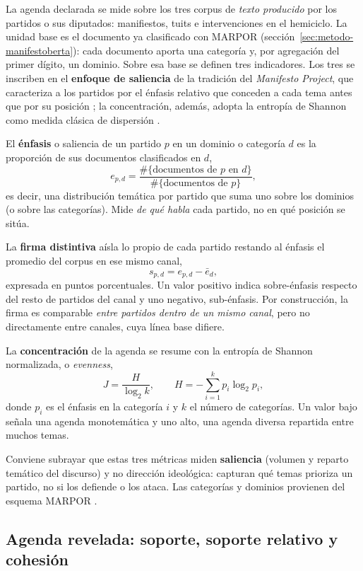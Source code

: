 La agenda declarada se mide sobre los tres corpus de \emph{texto producido} por
los partidos o sus diputados: manifiestos, tuits e intervenciones en el
hemiciclo. La unidad base es el documento ya clasificado con MARPOR
(sección~\ref{sec:metodo-manifestoberta}): cada documento aporta una categoría y,
por agregación del primer dígito, un dominio. Sobre esa base se definen tres
indicadores. Los tres se inscriben en el \textbf{enfoque de saliencia} de la
tradición del \emph{Manifesto Project}, que caracteriza a los partidos por el
énfasis relativo que conceden a cada tema antes que por su posición
\cite{laver1992party, marpor_mp_v5}; la concentración, además, adopta la entropía
de Shannon como medida clásica de dispersión \cite{shannon1948mathematical}.

El \textbf{énfasis} o saliencia de un partido $p$ en un dominio o categoría
$d$ es la proporción de sus documentos clasificados en $d$,
\[
e_{p,d} = \frac{\#\{\text{documentos de } p \text{ en } d\}}{\#\{\text{documentos de } p\}},
\]
es decir, una distribución temática por partido que suma uno sobre los dominios
(o sobre las categorías). Mide \emph{de qué habla} cada partido, no en qué
posición se sitúa.

La \textbf{firma distintiva} aísla lo propio de cada partido restando al énfasis
el promedio del corpus en ese mismo canal,
\[
s_{p,d} = e_{p,d} - \bar{e}_{d},
\]
expresada en puntos porcentuales. Un valor positivo indica sobre-énfasis
respecto del resto de partidos del canal y uno negativo, sub-énfasis. Por
construcción, la firma es comparable \emph{entre partidos dentro de un mismo
canal}, pero no directamente entre canales, cuya línea base difiere.

La \textbf{concentración} de la agenda se resume con la entropía de Shannon
\cite{shannon1948mathematical} normalizada, o \emph{evenness},
\[
J = \frac{H}{\log_2 k}, \qquad H = -\sum_{i=1}^{k} p_i \log_2 p_i,
\]
donde $p_i$ es el énfasis en la categoría $i$ y $k$ el número de categorías. Un
valor bajo señala una agenda monotemática y uno alto, una agenda diversa
repartida entre muchos temas.

Conviene subrayar que estas tres métricas miden \textbf{saliencia} (volumen y
reparto temático del discurso) y no dirección ideológica: capturan qué temas
prioriza un partido, no si los defiende o los ataca. Las categorías y dominios
provienen del esquema MARPOR \cite{marpor_mp_v5}.

\subsection{Agenda revelada: soporte, soporte relativo y cohesión}
\label{sec:metricas-revelada}

